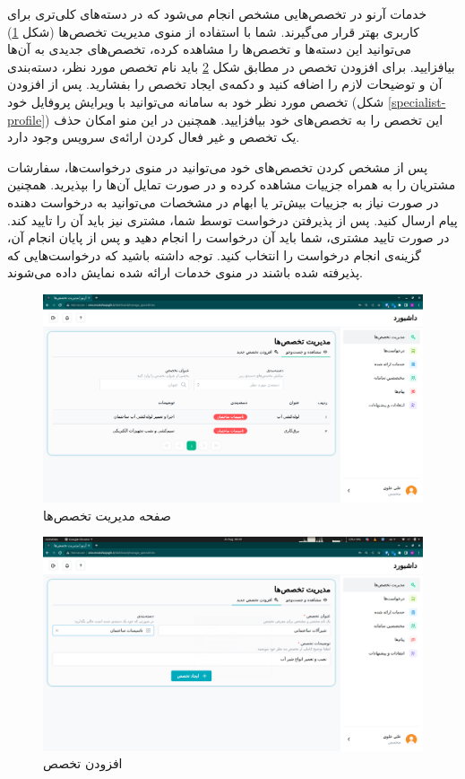 \FloatBarrier
خدمات آرنو در تخصص‌هایی مشخص انجام می‌شود که در دسته‌های کلی‌تری برای کاربری بهتر قرار می‌گیرند.
شما با استفاده از منوی مدیریت تخصص‌ها (شکل \ref{specialist-manage-specialities})  می‌توانید این دسته‌ها و تخصص‌ها را مشاهده کرده، تخصص‌های جدیدی به آن‌ها بیافزایید.
برای افزودن تخصص در مطابق شکل \ref{specialist-add-speciality} باید نام تخصص مورد نظر، دسته‌بندی آن و توضیحات لازم را اضافه کنید و دکمه‌ی ایجاد تخصص را بفشارید.
پس از افزودن تخصص مورد نظر خود به سامانه می‌توانید با ویرایش پروفایل خود (شکل \ref{specialist-profile}) این تخصص را به تخصص‌های خود بیافزایید.
همچنین در این منو امکان حذف یک تخصص و غیر فعال کردن ارائه‌ی سرویس وجود دارد.

پس از مشخص کردن تخصص‌های خود می‌توانید در منوی درخواست‌ها، سفارشات مشتریان را به همراه جزییات مشاهده کرده و در صورت تمایل آن‌ها را بپذیرید.
همچنین در صورت نیاز به جزییات بیش‌تر یا ابهام در مشخصات می‌توانید به درخواست دهنده پیام ارسال کنید.
پس از پذیرفتن درخواست توسط شما، مشتری نیز باید آن را تایید کند.
در صورت تایید مشتری، شما باید آن درخواست را انجام دهید و پس از پایان انجام آن، گزینه‌ی انجام درخواست را انتخاب کنید.
توجه داشته باشید که درخواست‌هایی که پذیرفته شده باشند در منوی خدمات ارائه شده نمایش داده می‌شوند.

\begin{figure}[h]
	\centering
	\includegraphics[width=\textwidth]{figs/user-guide/specialist-manage-specialities}
	\caption{صفحه مدیریت تخصص‌ها}
	\label{specialist-manage-specialities}
\end{figure}

\begin{figure}[h]
	\centering
	\includegraphics[width=\textwidth]{figs/user-guide/specialist-add-speciality}
	\caption{افزودن تخصص}
	\label{specialist-add-speciality}
\end{figure}

